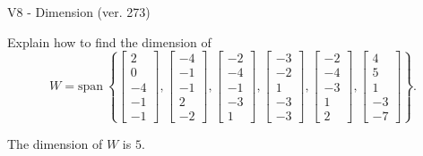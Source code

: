 \begin{exercise}
  \begin{exerciseTitle}V8 - Dimension (ver. 273)\end{exerciseTitle}
  \begin{exerciseStatement}
    Explain how to find the dimension of 
\[W=\mathrm{span}\ \left\{\left[\begin{array}{r}
2 \\
0 \\
-4 \\
-1 \\
-1
\end{array}\right] , \left[\begin{array}{r}
-4 \\
-1 \\
-1 \\
2 \\
-2
\end{array}\right] , \left[\begin{array}{r}
-2 \\
-4 \\
-1 \\
-3 \\
1
\end{array}\right] , \left[\begin{array}{r}
-3 \\
-2 \\
1 \\
-3 \\
-3
\end{array}\right] , \left[\begin{array}{r}
-2 \\
-4 \\
-3 \\
1 \\
2
\end{array}\right] , \left[\begin{array}{r}
4 \\
5 \\
1 \\
-3 \\
-7
\end{array}\right]\right\}.\]



  \end{exerciseStatement}
  \begin{exerciseAnswer}
   The dimension of \(W\) is  \(5\).
  


  \end{exerciseAnswer}
\end{exercise}